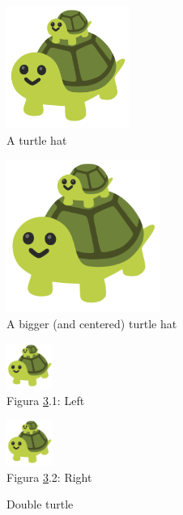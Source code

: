\documentclass[a4paper,12pt]{article}
\begin{document}
\begin{figure}[ht]
    \includegraphics[width=4cm]{taratuga.png}
    \caption{A turtle hat}
    \label{fig:turtle}
\end{figure}

\begin{figure}[ht]
    \centering
    \includegraphics[width=5cm]{taratuga.png}
    \caption{A bigger (and centered) turtle hat}
    \label{fig:bigturtle}
\end{figure}

\begin{figure}[ht]
    \centering
    \begin{minipage}{3.5cm}
        \centering
        \includegraphics[width=1.5cm]{taratuga.png} \\
        Figura \ref{fig:doubleturtle}.1: Left
    \end{minipage}
    \begin{minipage}{3.5cm}
        \centering
        \includegraphics[width=1.5cm]{taratuga.png} \\
        Figura \ref{fig:doubleturtle}.2: Right
    \end{minipage}
    \caption{Double turtle}
    \label{fig:doubleturtle}
\end{figure}
\end{document}
